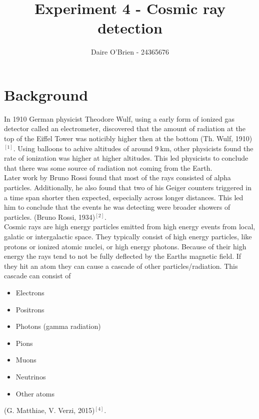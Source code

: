 \documentclass{article}
\title{Experiment 4 - Cosmic ray detection}
\author{Daire O'Brien - 24365676}
\begin{document}
\maketitle
\section{Background}
    In 1910 German physicist Theodore Wulf, using a early form of ionized gas detector called an electrometer, discovered that the amount of radiation at the top of the Eiffel Tower was noticibly higher then at the bottom (Th. Wulf, 1910)$^{[1]}$. Using balloons to achive altitudes of around $\qty{9}{\km}$, other physicists found the rate of ionization was higher at higher altitudes. This led physicists to conclude that there was some source of radiation not coming from the Earth. \\
    Later work by Bruno Rossi found that most of the rays consisted of alpha particles. Additionally, he also found that two of his Geiger counters triggered in a time span shorter then expected, especially across longer distances. This led him to conclude that the events he was detecting were broader showers of particles. (Bruno Rossi, 1934)$^{[2]}$. \\
    Cosmic rays are high energy particles emitted from high energy events from local, galatic or intergalactic space. They typically consist of high energy particles, like protons or ionized atomic nuclei, or high energy photons. Because of their high energy the rays tend to not be fully deflected by the Earths magnetic field. If they hit an atom they can cause a cascade of other particles/radiation. This cascade can consist of 
        \begin{itemize}
            \item Electrons
            \item Positrons
            \item Photons (gamma radiation)
            \item Pions 
            \item Muons
            \item Neutrinos
            \item Other atoms
        \end{itemize}
    (G. Matthiae, V. Verzi, 2015)$^{[4]}$.
\end{document}
